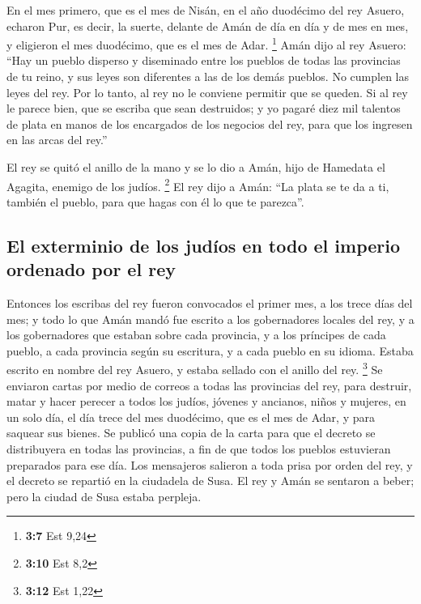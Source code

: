 \begin{paracol}{2}
 En el mes primero, que es el mes de Nisán, en el año
duodécimo del rey Asuero, echaron Pur, es decir, la suerte, delante de
Amán de día en día y de mes en mes, y eligieron el mes duodécimo, que es
el mes de Adar. \footnote{\textbf{3:7} Est 9,24}  Amán
dijo al rey Asuero: ``Hay un pueblo disperso y diseminado entre los
pueblos de todas las provincias de tu reino, y sus leyes son diferentes
a las de los demás pueblos. No cumplen las leyes del rey. Por lo tanto,
al rey no le conviene permitir que se queden.  Si al rey
le parece bien, que se escriba que sean destruidos; y yo pagaré diez mil
talentos de plata en manos de los encargados de los negocios del rey,
para que los ingresen en las arcas del rey.''

 El rey se quitó el anillo de la mano y se lo dio a Amán,
hijo de Hamedata el Agagita, enemigo de los judíos. \footnote{\textbf{3:10}
  Est 8,2}  El rey dijo a Amán: ``La plata se te da a ti,
también el pueblo, para que hagas con él lo que te parezca''.

\hypertarget{el-exterminio-de-los-juduxedos-en-todo-el-imperio-ordenado-por-el-rey}{%
\subsection{El exterminio de los judíos en todo el imperio ordenado por
el
rey}\label{el-exterminio-de-los-juduxedos-en-todo-el-imperio-ordenado-por-el-rey}}

 Entonces los escribas del rey fueron convocados el
primer mes, a los trece días del mes; y todo lo que Amán mandó fue
escrito a los gobernadores locales del rey, y a los gobernadores que
estaban sobre cada provincia, y a los príncipes de cada pueblo, a cada
provincia según su escritura, y a cada pueblo en su idioma. Estaba
escrito en nombre del rey Asuero, y estaba sellado con el anillo del
rey. \footnote{\textbf{3:12} Est 1,22}  Se enviaron
cartas por medio de correos a todas las provincias del rey, para
destruir, matar y hacer perecer a todos los judíos, jóvenes y ancianos,
niños y mujeres, en un solo día, el día trece del mes duodécimo, que es
el mes de Adar, y para saquear sus bienes.  Se publicó
una copia de la carta para que el decreto se distribuyera en todas las
provincias, a fin de que todos los pueblos estuvieran preparados para
ese día.  Los mensajeros salieron a toda prisa por orden
del rey, y el decreto se repartió en la ciudadela de Susa. El rey y Amán
se sentaron a beber; pero la ciudad de Susa estaba perpleja.


\end{paracol}

